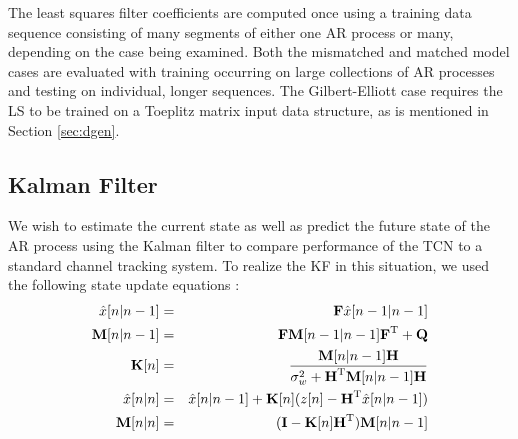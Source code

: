 \documentclass[twocolumn,letterpaper]{IEEEAerospaceCLS}  %
\begin{document}
The least squares filter coefficients are computed once using a training data sequence consisting of many segments of either one AR process or many, depending on the case being examined. Both the mismatched and matched model cases are evaluated with training occurring on large collections of AR processes and testing on individual, longer sequences. The Gilbert-Elliott case requires the LS to be trained on a Toeplitz matrix input data structure, as is mentioned in Section \ref{sec:dgen}.
 

\subsection{Kalman Filter}

 We wish to estimate the current state as well as predict the future state of the AR process using the Kalman filter to compare performance of the TCN to a standard channel tracking system. To realize the KF in this situation, we used the following state update equations \cite{kay1993fundamentals}: \\
\begin{eqnarray*}
\hat{x}[n|n-1]&=&\textbf{F}\hat{x}[n-1|n-1] \\
\textbf{M}[n|n-1]&=&\textbf{FM}[n-1|n-1]\textbf{F}^{\rm T} + \textbf{Q} \\
\textbf{K}[n]&=&\frac{\textbf{M}[n|n-1]\textbf{H}}{\sigma_{w}^{2} + \textbf{H}^{\rm T}\textbf{M}[n|n-1]\textbf{H}} \\
\hat{x}[n|n]&=&\hat{x}[n|n-1] + \textbf{K}[n](z[n]-\textbf{H}^{\rm T}\hat{x}[n|n-1]) \\
\textbf{M}[n|n]&=&(\textbf{I}-\textbf{K}[n]\textbf{H}^{\rm T})\textbf{M}[n|n-1]
\end{eqnarray*}
\end{document}
